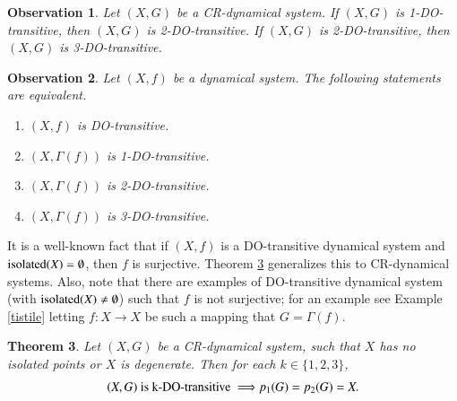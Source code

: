 \documentclass[a4paper,12pt]{article} %
\newcommand{\isolated}{\textup{isolated}}
\newtheorem{theorem}{Theorem}[section]
\newtheorem{observation}[theorem]{Observation}
\begin{document}
\begin{observation}\label{observation1}
Let $(X,G)$ be a CR-dynamical system. If $(X,G)$ is 1-DO-transitive, then $(X,G)$ is 2-DO-transitive.  If $(X,G)$ is 2-DO-transitive, then $(X,G)$ is 3-DO-transitive. 
\end{observation}
\begin{observation}
Let $(X,f)$ be a dynamical system. The following statements are equivalent.
\begin{enumerate}
\item $(X,f)$ is DO-transitive.
\item $(X,\Gamma(f))$ is 1-DO-transitive.
\item $(X,\Gamma(f))$ is 2-DO-transitive.
\item $(X,\Gamma(f))$ is 3-DO-transitive.
\end{enumerate}
\end{observation}
It is a well-known fact that if $(X,f)$ is a DO-transitive dynamical system and  $\isolated(X)=\emptyset$, then $f$ is surjective.  Theorem \ref{erceg} generalizes this to CR-dynamical systems. Also, note that there are examples of DO-transitive dynamical system (with  $\isolated(X)\neq \emptyset$) such that $f$ is not surjective; for an example see Example \ref{tistile} letting $f:X\rightarrow X$ be such a mapping that $G=\Gamma(f)$. 
\begin{theorem}\label{erceg}
Let $(X,G)$ be a CR-dynamical system,  such that $X$ has no isolated points or $X$ is degenerate.  Then for each $k\in \{1,2,3\}$,
$$
(X,G) \textup{ is k-DO-transitive } \Longrightarrow p_1(G)=p_2(G)=X.
$$
\end{theorem}
\end{document}
